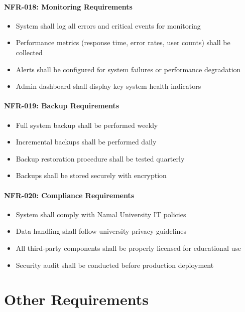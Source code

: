 \documentclass[12pt,a4paper]{article}
\begin{document}
\begin{enumerate}
\paragraph{NFR-018: Monitoring Requirements}
\begin{itemize}
    \item System shall log all errors and critical events for monitoring
    \item Performance metrics (response time, error rates, user counts) shall be collected
    \item Alerts shall be configured for system failures or performance degradation
    \item Admin dashboard shall display key system health indicators
\end{itemize}

\paragraph{NFR-019: Backup Requirements}
\begin{itemize}
    \item Full system backup shall be performed weekly
    \item Incremental backups shall be performed daily
    \item Backup restoration procedure shall be tested quarterly
    \item Backups shall be stored securely with encryption
\end{itemize}

\paragraph{NFR-020: Compliance Requirements}
\begin{itemize}
    \item System shall comply with Namal University IT policies
    \item Data handling shall follow university privacy guidelines
    \item All third-party components shall be properly licensed for educational use
    \item Security audit shall be conducted before production deployment
\end{itemize}

\newpage

\section{Other Requirements}


\end{enumerate}
\end{document}
